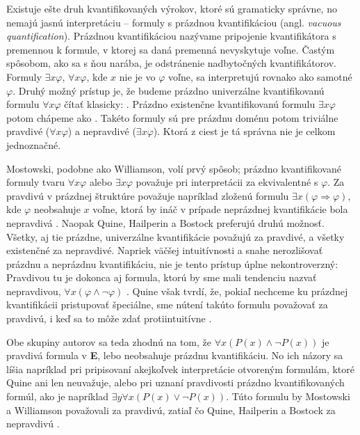\documentclass[12pt, letterpaper]{article}
\begin{document}
Existuje ešte druh kvantifikovaných výrokov, ktoré sú gramaticky správne, no nemajú jasnú interpretáciu -- formuly s prázdnou kvantifikáciou (angl. \textit{vacuous quantification}). Prázdnou kvantifikáciou nazývame pripojenie kvantifikátora s premennou k formule, v ktorej sa daná premenná nevyskytuje voľne. Častým spôsobom, ako sa s ňou narába, je odstránenie nadbytočných kvantifikátorov. Formuly $\exists x \varphi$, $\forall x \varphi$, kde $x$ nie je vo $\varphi$ voľne, sa interpretujú rovnako ako samotné $\varphi$. Druhý možný prístup je, že budeme prázdno univerzálne kvantifikovanú formulu $\forall x \varphi$ čítať klasicky: . Prázdno existenčne kvantifikovanú formulu $\exists x \varphi$ potom chápeme ako . Takéto formuly sú pre prázdnu doménu potom triviálne pravdivé ($\forall x \varphi$) a nepravdivé ($\exists x \varphi$). Ktorá z ciest je tá správna nie je celkom jednoznačné.\par 
Mostowski, podobne ako Williamson, volí prvý spôsob; prázdno kvantifikované formuly tvaru $\forall x \varphi$ alebo $\exists x \varphi$ považuje pri interpretácii za ekvivalentné s $\varphi$. Za pravdivú v prázdnej štruktúre považuje napríklad zloženú formulu $\exists x (\varphi \Rightarrow \varphi)$, kde $\varphi$ neobsahuje $x$ voľne, ktorá by ináč v prípade neprázdnej kvantifikácie bola nepravdivá \parencites[197]{hailperin_quantification_1953}[108]{mostowski_rules_1951}[5]{williamson_note_1999}.
Naopak Quine, Hailperin a Bostock preferujú druhú možnosť. Všetky, aj tie prázdne, univerzálne kvantifikácie považujú za pravdivé, a všetky existenčné za nepravdivé. Napriek väčšej intuitívnosti a snahe nerozlišovať prázdnu a neprázdnu kvantifikáciu, nie je tento prístup úplne nekontroverzný: Pravdivou tu je dokonca aj formula, ktorú by sme mali tendenciu nazvať nepravdivou, $\forall x (\varphi \land \neg \varphi)$ \parencites[348--349]{bostock_intermediate_1997}{hailperin_quantification_1953}. Quine však tvrdí, že, pokiaľ nechceme ku prázdnej kvantifikácii pristupovať špeciálne, sme nútení takúto formulu považovať za pravdivú, i keď sa to môže zdať protiintuitívne \parencites[177--178]{quine_quantification_1954}.\par
Obe skupiny autorov sa teda zhodnú na tom, že $\forall x (P(x) \land \neg P(x))$ je pravdivá formula v \textbf{E}, lebo neobsahuje prázdnu kvantifikáciu. No ich názory sa líšia napríklad pri pripisovaní akejkoľvek interpretácie otvoreným formulám, ktoré Quine ani len neuvažuje, alebo pri uznaní pravdivosti prázdno kvantifikovaných formúl, ako je napríklad $\exists y \forall x (P(x) \lor \neg P(x))$. Túto formulu by Mostowski a Williamson považovali za pravdivú, zatiaľ čo Quine, Hailperin a Bostock za nepravdivú \parencites[348--349]{bostock_intermediate_1997}{hailperin_quantification_1953}{mostowski_rules_1951}{quine_quantification_1954}{williamson_note_1999}.\par
\end{document}

